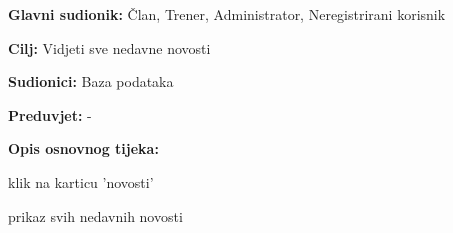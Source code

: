 					\noindent {}
					\begin{packed_item}
	
						\item \textbf{Glavni sudionik: }Član, Trener, Administrator, Neregistrirani korisnik
						\item  \textbf{Cilj: } Vidjeti sve nedavne novosti
						\item  \textbf{Sudionici: } Baza podataka
						\item  \textbf{Preduvjet: } -
						\item  \textbf{Opis osnovnog tijeka:}
						
						\item[] \begin{packed_enum}
	
							\item klik na karticu 'novosti'
							\item prikaz svih nedavnih novosti
							
						\end{packed_enum}
						
					\end{packed_item}
					
